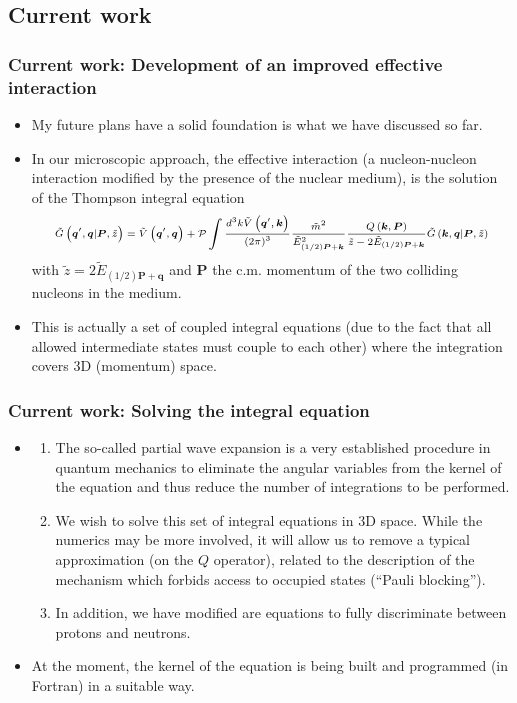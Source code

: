 \documentclass[10pt,serif]{beamer}
\newcommand{\bvec}[1]{\boldsymbol{#1}}
\newcommand{\rb}[1]{\left(#1\right)}
\begin{document}
\subsection{Current work}
\begin{frame}
\frametitle{Current work: Development of an improved effective interaction}
\begin{itemize}
\item \alert{My future plans have a solid foundation is what we have discussed so far}.
\item In our microscopic approach, the effective interaction (a nucleon-nucleon interaction modified by the presence of the nuclear medium), is the solution of the Thompson integral equation
\begin{equation}
\scriptsize{
\tilde{G} \rb{\bvec{q}^\prime,\bvec{q}|\bvec{P},\tilde{z}} = \tilde{V} \rb{\bvec{q}^\prime,\bvec{q}} + \mathcal{P} \int \frac{d^3k \tilde{V} \rb{\bvec{q}^\prime,\bvec{k}} }{\rb{2 \pi}^3} \frac{\tilde{m}^2}{\tilde{E}^2_{\rb{1/2}\bvec{P}+\bvec{k}}} \frac{Q \rb{\bvec{k},\bvec{P}}}{\tilde{z}-2\tilde{E}_{\rb{1/2}\bvec{P}+\bvec{k}}} \tilde{G} \rb{\bvec{k},\bvec{q}|\bvec{P},\tilde{z}}
}
\end{equation}
with $\tilde{z}=2\tilde{E}_{\rb{1/2}\bvec{P}+\bvec{q}}$ and $\bvec{P}$ the c.m. momentum of the two colliding nucleons in the medium.
\item This is actually a set of coupled integral equations (due to the fact that all allowed intermediate states must couple to each other) where the integration covers 3D (momentum) space.
\end{itemize}
\end{frame}
\begin{frame}
\frametitle{Current work: Solving the integral equation}
\begin{itemize}
\item {}
\begin{enumerate}
\item The so-called partial wave expansion is a very established procedure in quantum mechanics to eliminate the angular variables from the kernel of the equation and thus reduce the number of integrations to be performed.
\item We wish to solve this set of integral equations in 3D space. \alert{While the numerics may be more involved}, it will allow us to remove a typical approximation (on the $Q$ operator), related to the description of the mechanism which forbids access to occupied states (``Pauli blocking'').
\item In addition, we have modified are equations to fully discriminate between protons and neutrons. 
\end{enumerate}
\item At the moment, the kernel of the equation is being built and programmed (in Fortran) in a suitable way.
\end{itemize}
\end{frame}
\end{document}

